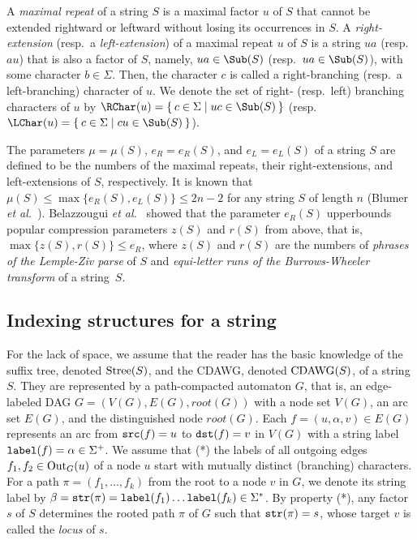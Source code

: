\documentclass{article}
\begin{document}
A \textit{maximal repeat} of a string $S$ is a maximal factor $u$ of $S$ that cannot be extended rightward or leftward without losing its occurrences in $S$. A \textit{right-extension} (resp.~a \textit{left-extension}) of a maximal repeat $u$ of $S$ is a string $ua$ (resp.~$au$) that is also a factor of $S$, namely, $ua \in \Sub(S)$ (resp.~$ua \in \Sub(S)$), with some character $b \in \Sigma$. Then, the character $c$ is called a right-branching (resp.~a left-branching) character of $u$. We denote the set of right- (resp.~left) branching characters of $u$ by $\RChar(u) = \sete{ c \in \Sigma \mid uc \in \Sub(S) }$ (resp.~$\LChar(u) = \sete{ c \in \Sigma \mid cu \in \Sub(S) }$). 

The parameters $\mu = \mu(S)$, $e_R = e_R(S)$, and $e_L = e_L(S)$ of a string $S$ are defined to be the numbers of the maximal repeats, their right-extensions, and left-extensions of $S$, respectively. It is known that $\mu(S) \le \max\{e_R(S), e_L(S)\} \le 2n - 2$ for any string $S$ of length $n$ (Blumer \textit{et al.}~\cite{blumer1987complete}).
Belazzougui \textit{et al.}~\cite{belazzougui:nunial:gagie:prezza:raffinot2015composite} showed that the parameter $e_R(S)$ upperbounds popular compression parameters $z(S)$ and $r(S)$ from above, that is, $\max\{z(S), r(S)\} \le e_R$, where $z(S)$ and $r(S)$ are the numbers of \textit{phrases of the Lemple-Ziv parse} of $S$ and \textit{equi-letter runs of the Burrows-Wheeler transform} of a string~$S$. 

\subsection{Indexing structures for a string}
For the lack of space, we assume that the reader has the basic knowledge of the suffix tree, denoted $\mathrm{Stree}(S)$, and the CDAWG, denoted $\mathrm{CDAWG}(S)$, of a string $S$. 
They are represented by a path-compacted automaton $G$, that is, an edge-labeled DAG $G = (V(G), E(G), root(G))$ with a node set $V(G)$, an arc set $E(G)$, and the distinguished node $root(G)$. 
Each $f = (u, \alpha, v) \in E(G)$ represents an arc from $\mathtt{src}(f)=u$ to $\mathtt{dst}(f)=v$ in $V(G)$ with a string label $\mathtt{label}(f)=\alpha \in \Sigma^+$. 
We assume 
that (*) the labels of all outgoing edges $f_1, f_2 \in \mathrm{Out}_{G}(u)$ of a node $u$ start with mutually distinct (branching) characters. 
For a path $\pi = (f_1, \dots, f_k)$ from the root to a node $v$ in $G$, we denote its string label by $\beta = \mathtt{str}(\pi) = \mathtt{label}(f_1)\dots \mathtt{label}(f_k) \in \Sigma^*$. 
By property (*), 
any factor $s$ of $S$ determines the rooted path $\pi$ of $G$ such that $\mathtt{str}(\pi) = s$, whose target $v$ is called the \textit{locus} of $s$. 
\end{document}
